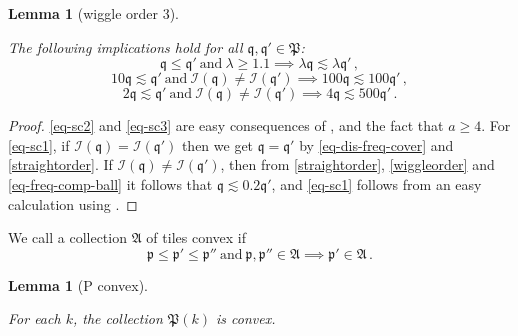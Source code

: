 \documentclass[10pt,a4paper]{article}
\theoremstyle{plain}
\newtheorem{lemma}[theorem]{Lemma}
\theoremstyle{definition}
\numberwithin{equation}{subsection}
\newcommand{\fp}{{\mathfrak p}}
\newcommand{\fP}{{\mathfrak P}}
\newcommand{\fq}{{\mathfrak q}}
\newcommand{\scI}{{\mathcal{I}}} %
\newcommand{\lean}[1]{}
\newcommand{\uses}[1]{}
\newcommand{\leanok}{}
\begin{document}
\begin{lemma}[wiggle order 3]
\label{wiggle-order-3}
\leanok
\lean{wiggle_order_11_10, wiggle_order_100, wiggle_order_500}
\uses{wiggle-order-1, wiggle-order-2}
    The following implications hold for all $\fq, \fq' \in \fP$:
    \begin{equation}
        \label{eq-sc1}
        \fq \le \fq' \ \text{and} \ \lambda \ge 1.1 \implies \lambda \fq \lesssim \lambda \fq'\,,
    \end{equation}
    \begin{equation}
        \label{eq-sc2}
        10\fq \lesssim \fq' \ \text{and} \ \scI(\fq) \ne \scI(\fq') \implies 100 \fq \lesssim 100 \fq'\,,
    \end{equation}
    \begin{equation}
        \label{eq-sc3}
        2\fq \lesssim \fq' \ \text{and} \ \scI(\fq) \ne \scI(\fq') \implies 4 \fq \lesssim 500 \fq'\,.
    \end{equation}
\end{lemma}

\begin{proof}
    \leanok
    \eqref{eq-sc2} and \eqref{eq-sc3} are easy consequences of ,  and the fact that $a \ge 4$.
    For \eqref{eq-sc1}, if $\scI(\fq) = \scI(\fq')$ then
    we get $\fq = \fq'$ by \eqref{eq-dis-freq-cover} and \eqref{straightorder}.
    If $\scI(\fq) \ne \scI(\fq')$, then from \eqref{straightorder},
    \eqref{wiggleorder} and \eqref{eq-freq-comp-ball} it follows that
    $\fq \lesssim 0.2\fq'$, and \eqref{eq-sc1} follows from an easy calculation using
    .
\end{proof}



We call a collection $\mathfrak{A}$ of tiles convex if
\begin{equation}
    \label{eq-convexity}
    \fp \le \fp' \le \fp'' \ \text{and} \ \fp, \fp'' \in \mathfrak{A} \implies \fp' \in \mathfrak{A}\,.
\end{equation}

\begin{lemma}[P convex]
    \label{P-convex}
    \leanok
    \lean{ordConnected_tilesAt}

    For each $k$, the collection $\fP(k)$ is convex.
\end{lemma}
\end{document}
